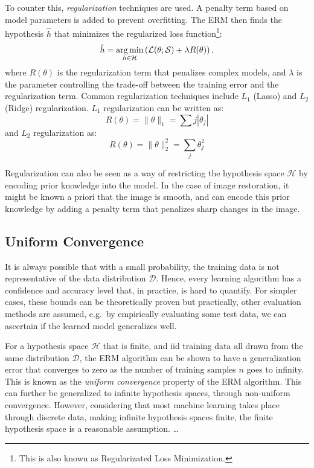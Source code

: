 To counter this, \textit{regularization} techniques are used. A penalty term based on model parameters is added to prevent overfitting. The \gls{ERM} then finds the hypothesis $\hat{h}$ that minimizes the regularized loss function\footnote{This is also known as Regularizated Loss Minimization.}:
\begin{equation}
    \hat{h} = \operatorname*{arg\,min}_{h \in \mathcal{H}} \left(\mathcal{L}(\theta; \mathcal{S})  + \lambda R(\theta) \right).
\end{equation}
where $R(\theta)$ is the regularization term that penalizes complex models, and $\lambda$ is the parameter controlling the trade-off between the training error and the regularization term. Common regularization techniques include $L_1$ (Lasso) and $L_2$ (Ridge) regularization. $L_1$ regularization can be written as:
\begin{equation*}
    R(\theta) = \|\theta\|_1 = \sum{j} |\theta_j|
\end{equation*}
and $L_2$ regularization as:
\begin{equation*}
    R(\theta) = \|\theta\|^2_2 = \sum_{j} \theta_j^2
\end{equation*}

Regularization can also be seen as a way of restricting the hypothesis space $\mathcal{H}$ by encoding prior knowledge into the model. In the case of image restoration, it might be known a priori that the image is smooth, and  can encode this prior knowledge by adding a penalty term that penalizes sharp changes in the image.


\subsection{Uniform Convergence}
It is always possible that with a small probability, the training data is not representative of the data distribution $\mathcal{D}$. Hence, every learning algorithm has a confidence and accuracy level that, in practice, is hard to quantify. For simpler cases, these bounds can be theoretically proven but practically, other evaluation methods are assumed, e.g.\ by empirically evaluating some test data, we can ascertain if the learned model generalizes well.

For a hypothesis space $\mathcal{H}$ that is finite, and \gls{iid} training data all drawn from the same distribution $\mathcal{D}$, the \gls{ERM} algorithm can be shown to have a generalization error that converges to zero as the number of training samples $n$ goes to infinity. This is known as the \textit{uniform convergence} property of the \gls{ERM} algorithm. This can further be generalized to infinite hypothesis spaces, through non-uniform convergence. However, considering that most machine learning takes place through discrete data, making infinite hypothesis spaces finite, the finite hypothesis space is a reasonable assumption.
\dots
